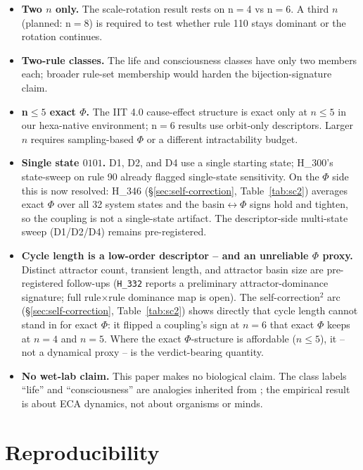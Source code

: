 \documentclass[11pt,a4paper]{article}
\begin{document}
\begin{itemize}\itemsep0.2em
\item \textbf{Two $n$ only.} The scale-rotation result rests on n$=$4
      vs n$=$6. A third $n$ (planned: n$=$8) is required to test
      whether rule 110 stays dominant or the rotation continues.
\item \textbf{Two-rule classes.} The life and consciousness classes
      have only two members each; broader rule-set membership would
      harden the bijection-signature claim.
\item \textbf{n$\leq 5$ exact $\Phi$.} The IIT 4.0 cause-effect
      structure is exact only at $n \leq 5$ in our hexa-native
      environment; n$=$6 results use orbit-only descriptors. Larger
      $n$ requires sampling-based $\Phi$ \citep{albantakis2023iit4} or
      a different intractability budget.
\item \textbf{Single state $0101$.} D1, D2, and D4 use a single
      starting state; H\_300's state-sweep on rule 90 already
      flagged single-state sensitivity. On the $\Phi$ side this is now
      resolved: H\_346 (\S\ref{sec:self-correction}, Table~\ref{tab:sc2})
      averages exact $\Phi$ over all 32 system states and the
      basin$\leftrightarrow\Phi$ signs hold and tighten, so the coupling
      is not a single-state artifact. The descriptor-side multi-state
      sweep (D1/D2/D4) remains pre-registered.
\item \textbf{Cycle length is a low-order descriptor -- and an
      unreliable $\Phi$ proxy.} Distinct attractor count, transient
      length, and attractor basin size are pre-registered follow-ups
      (\texttt{H\_332} reports a preliminary attractor-dominance
      signature; full rule$\times$rule dominance map is open). The
      self-correction$^2$ arc (\S\ref{sec:self-correction},
      Table~\ref{tab:sc2}) shows directly that cycle length cannot
      stand in for exact $\Phi$: it flipped a coupling's sign at $n=6$
      that exact $\Phi$ keeps at $n=4$ and $n=5$. Where the exact
      $\Phi$-structure is affordable ($n\leq 5$), it -- not a dynamical
      proxy -- is the verdict-bearing quantity.
\item \textbf{No wet-lab claim.} This paper makes no biological
      claim. The class labels ``life'' and ``consciousness'' are
      analogies inherited from \citep{anima_H287}; the empirical
      result is about ECA dynamics, not about organisms or minds.
\end{itemize}

\section{Reproducibility}
\label{sec:repro}
\end{document}
